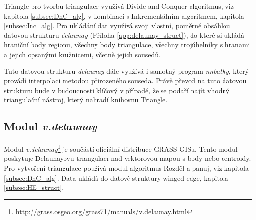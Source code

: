 \documentclass[12pt,a4paper]{article}
\begin{document}
Triangle pro tvorbu triangulace využívá Divide and Conquer algoritmus, viz kapitola \ref{subsec:DnC_alg}, v kombinaci s Inkrementálním algoritmem, kapitola \ref{subsec:Inc_alg}. Pro ukládání dat využívá svoji vlastní, poměrně obsáhlou datovou strukturu \emph{delaunay} (Příloha \ref{app:delaunay_struct}), do které si ukládá hraniční body regionu, všechny body triangulace, všechny trojúhelníky s hranami a jejich opsanými kružnicemi, včetně jejich sousedů. 

Tuto datovou strukturu \emph{delaunay} dále využívá i samotný program \emph{nnbathy}, který provádí interpolaci metodou přirozeného souseda. Právě převod na tuto datovou strukturu bude v budoucnosti klíčový v případě, že se podaří najít vhodný triangulační nástroj, který nahradí knihovnu Triangle.

\newpage
\subsection{Modul \emph{v.delaunay}}
\label{subsec:v.delaunay}
Modul \emph{v.delaunay}\footnote{http://grass.osgeo.org/grass71/manuals/v.delaunay.html} je součástí oficiální distribuce GRASS GISu. Tento modul poskytuje Delaunayovu triangulaci nad vektorovou mapou s body nebo centroidy. Pro vytvoření triangulace používá modul algoritmus Rozděl a panuj, viz kapitola \ref{subsec:DnC_alg}. Data ukládá do datové struktury winged-edge, kapitola \ref{subsec:HE_struct}.

\begin{figure}[h!]
\centering
\begin{floatrow}
\end{floatrow}
\end{figure}
\end{document}
